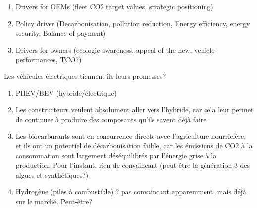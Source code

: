 \documentclass{article}
\begin{document}
 \begin{enumerate}
 	\item Drivers for OEMs (fleet CO2 target values, strategic positioning)
 	\item Policy driver (Decarbonisation, pollution reduction, Energy efficiency, energy security, Balance of payment)
 	\item Drivers for owners (ecologic awareness, appeal of the new, vehicle performances, TCO?)
 \end{enumerate}
 Les véhicules électriques tiennent-ils leurs promesses? 
\begin{enumerate}
	\item PHEV/BEV (hybride/électrique) 	
 	\item Les constructeurs veulent absolument aller vers l'hybride, car cela leur permet de continuer à produire des composants qu'ils savent déjà faire.
 	\item Les biocarburants sont en concurrence directe avec l'agriculture nourricière, et ils ont un potentiel de décarbonisation faible, car les émissions de CO2 à la consommation sont largement déséquilibrés par l'énergie grise à la production. Pour l'instant, rien de convaincant (peut-être la génération 3 des algues et synthétiques?)
 	\item Hydrogène (piles à combustible) ? pas convaincant apparemment, mais déjà sur le marché. Peut-être?
\end{enumerate}
\end{document}
